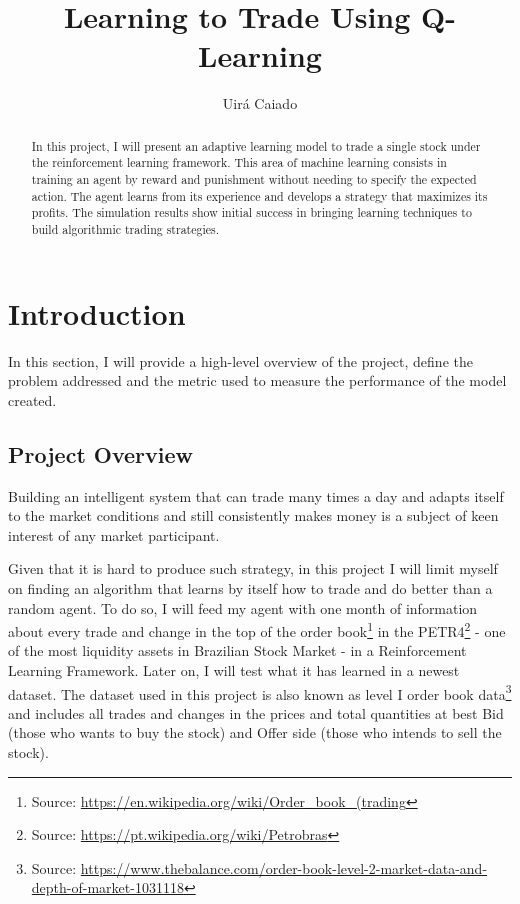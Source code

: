 \documentclass[a4paper]{article}
\title{Learning to Trade Using Q-Learning}
\author{Uirá Caiado}
\begin{document}
\maketitle

\begin{abstract}
In this project, I will present an adaptive learning model to trade a single stock under the reinforcement learning framework. This area of machine learning consists in training an agent by reward and punishment without needing to specify the expected action. The agent learns from its experience and develops a strategy that maximizes its profits. The simulation results show initial success in bringing learning techniques to build algorithmic trading strategies.
\end{abstract}


\section{Introduction}
\label{sec:introduction}

In this section, I will provide a high-level overview of the project, define the problem addressed and the metric used to measure the performance of the model created.

\subsection{Project Overview}
Building an intelligent system that can trade many times a day and adapts itself to the market conditions and still consistently makes money is a subject of keen interest of any market participant.

Given that it is hard to produce such strategy, in this project I will limit myself on finding an algorithm that learns by itself how to trade and do better than a random agent. To do so, I will feed my agent with one month of information about every trade and change in the top of the order book\footnote{Source: \url{https://en.wikipedia.org/wiki/Order_book_(trading}} in the PETR4\footnote{Source: \url{https://pt.wikipedia.org/wiki/Petrobras}} - one of the most liquidity assets in Brazilian Stock Market - in a Reinforcement Learning Framework. Later on, I will test what it has learned in a newest dataset. The dataset used in this project is also known as level I order book data\footnote{Source: \url{https://www.thebalance.com/order-book-level-2-market-data-and-depth-of-market-1031118}} and includes all trades and changes in the prices and total quantities at best Bid (those who wants to buy the stock) and Offer side (those who intends to sell the stock).
\end{document}

